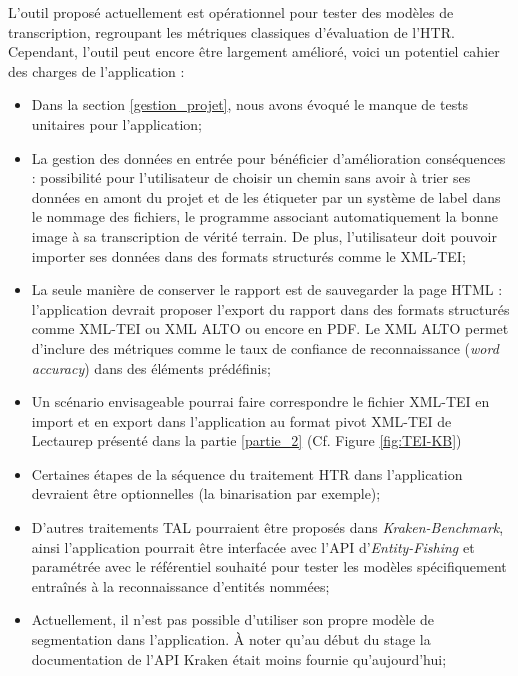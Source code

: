 L'outil proposé actuellement est opérationnel pour tester des modèles de transcription, regroupant les métriques classiques d'évaluation de l'HTR. Cependant, l'outil peut encore être largement amélioré, voici un potentiel cahier des charges de l'application :
\begin{itemize}
    \item Dans la section \ref{gestion_projet}, nous avons évoqué le manque de tests unitaires pour l'application;
    \item La gestion des données en entrée pour bénéficier d'amélioration conséquences : possibilité pour l'utilisateur de choisir un chemin sans avoir à trier ses données en amont du projet et de les étiqueter par un système de label dans le nommage des fichiers, le programme associant automatiquement la bonne image à sa transcription de vérité terrain. De plus, l'utilisateur doit pouvoir importer ses données dans des formats structurés comme le XML-TEI;
    \item La seule manière de conserver le rapport est de sauvegarder la page HTML : l'application devrait proposer l'export du rapport dans des formats structurés comme XML-TEI ou XML ALTO ou encore en PDF. Le XML ALTO permet d'inclure des métriques comme le taux de confiance de reconnaissance (\textit{word accuracy}) dans des éléments prédéfinis; 
    \item Un scénario envisageable pourrai faire correspondre le fichier XML-TEI en import et en export dans l'application au format pivot XML-TEI de Lectaurep présenté dans la partie \ref{partie_2} (Cf. Figure \ref{fig:TEI-KB})
    \item Certaines étapes de la séquence du traitement HTR dans l'application devraient être optionnelles (la binarisation par exemple);
    \item D'autres traitements TAL pourraient être proposés dans \textit{Kraken-Benchmark}, ainsi l'application pourrait être interfacée avec l'API d'\textit{Entity-Fishing} et paramétrée avec le référentiel souhaité pour tester les modèles spécifiquement entraînés à la reconnaissance d'entités nommées; 
    \item Actuellement, il n'est pas possible d'utiliser son propre modèle de segmentation dans l'application. À noter qu'au début du stage la documentation de l'API Kraken était moins fournie qu'aujourd'hui;

\end{itemize}
